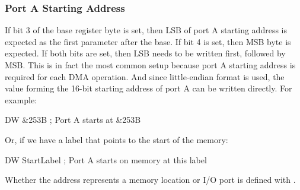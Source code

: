 \subsubsection{Port A Starting Address}

If bit 3 of the base register byte is set, then LSB of port A starting address is expected as the first parameter after the base. If bit 4 is set, then MSB byte is expected. If both bits are set, then LSB needs to be written first, followed by MSB. This is in fact the most common setup because port A starting address is required for each DMA operation. And since little-endian format is used, the value forming the 16-bit starting address of port A can be written directly. For example:

\begin{tcblisting}{}
	DW &253B          ; Port A starts at &253B
\end{tcblisting}
\vspace*{-1ex}

Or, if we have a label that points to the start of the memory:

\begin{tcblisting}{}
	DW StartLabel     ; Port A starts on memory at this label
\end{tcblisting}
\vspace*{-1ex}

Whether the address represents a memory location or I/O port is defined with .


